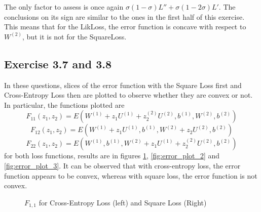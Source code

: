 \documentclass[fleqn]{article}
\begin{document}
The only factor to assess is once again $\sigma (1-\sigma) L'' + \sigma (1-2 \sigma) L'$. The conclusions on its sign are similar to the ones in the first half of this exercise. This means that for the LikLoss, the error function is concave with respect to $W^{(2)}$, but it is not for the SquareLoss.

\subsection*{Exercise 3.7 and 3.8}
In these questions, slices of the error function with the Square Loss first and Cross-Entropy Loss then are plotted to observe whether they are convex or not. In particular, the functions plotted are
\begin{equation}
    F_{11}(z_1, z_2) = E(W^{(1)} + z_1 U^{(1)} + z_2 ^{(2)} U^{(2)}, b^{(1)}, W^{(2)}, b^{(2)})
\end{equation}
\begin{equation}
    F_{12}(z_1, z_2) = E(W^{(1)} + z_1 U^{(1)}, b^{(1)}, W^{(2)} + z_2 U^{(2)}, b^{(2)})
\end{equation}
\begin{equation}
    F_{22}(z_1, z_2) = E(W^{(1)}, b^{(1)}, W^{(2)} + z_1 U^{(1)} + z_2 ^{(2)} U^{(2)}, b^{(2)})
\end{equation}
for both loss functions, results are in figures \ref{fig:error_plot_1}, \ref{fig:error_plot_2} and \ref{fig:error_plot_3}. It can be observed that with cross-entropy loss, the error function appears to be convex, whereas with square loss, the error function is not convex.
\begin{figure}[H]
    \centering
    \qquad
    \caption{$F_{1,1}$ for Cross-Entropy Loss (left) and Square Loss (Right)}
    \label{fig:error_plot_1}
\end{figure}
\end{document}
